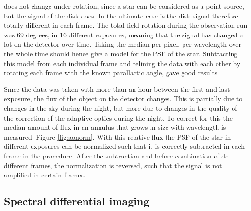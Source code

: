 \documentclass[twoside,single]{lion-msc}
\begin{document}
\noindent
does not change under rotation, since a star can be considered as a point-source, but the signal of the disk does. In the ultimate case is the disk signal therefore totally different in each frame. The total field rotation during the observation run was 69 degrees, in 16 different exposures, meaning that the signal has changed a lot on the detector over time. Taking the median per pixel, per wavelength over the whole time should hence give a model for the PSF of the star. Subtracting this model from each individual frame and relining the data with each other by rotating each frame with the known parallactic angle, gave good results. 
\bigskip

Since the data was taken with more than an hour between the first and last exposure, the flux of the object on the detector changes. This is partially due to changes in the sky during the night, but more due to changes in the quality of the correction of the adaptive optics during the night. To correct for this the median amount of flux in an annulus that grows in size with wavelength is measured, Figure \ref{fig:aonorm}. With this relative flux the PSF of the star in different exposures can be normalized such that it is correctly subtracted in each frame in the procedure. After the subtraction and before combination of de different frames, the normalization is reversed, such that the signal is not amplified in certain frames.


\subsection{Spectral differential imaging}
\end{document}
